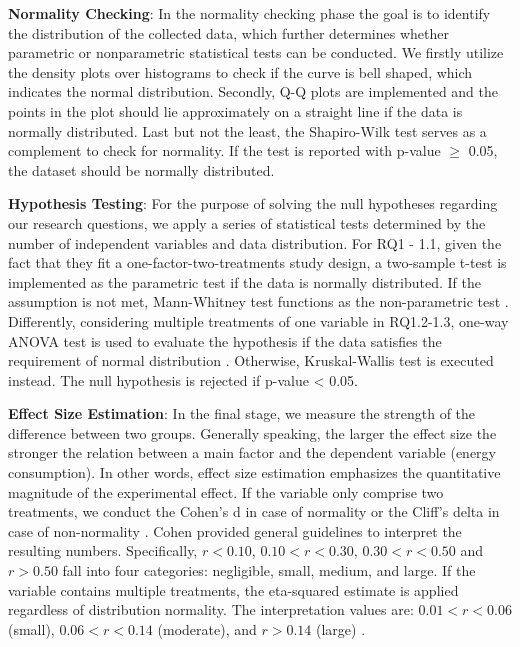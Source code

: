 	\textbf{Normality Checking}: In the normality checking phase the goal is to identify the distribution of the collected data, which further determines whether parametric or nonparametric statistical tests can be conducted. We firstly utilize the density plots over histograms to check if the curve is bell shaped, which indicates the normal distribution. Secondly, Q-Q plots are implemented and the points in the plot should lie approximately on a straight line if the data is normally distributed. Last but not the least, the Shapiro-Wilk test serves as a complement to check for normality. If the test is reported with p-value $\ge$ 0.05, the dataset should be normally distributed. 
	
	\textbf{Hypothesis Testing}: For the purpose of solving the null hypotheses regarding our research questions, we apply a series of statistical tests determined by the number of independent variables and data distribution. For RQ1 - 1.1, given the fact that they fit a one-factor-two-treatments study design, a two-sample t-test is implemented as the parametric test if the data is normally distributed. If the assumption is not met, Mann-Whitney test functions as the non-parametric test \cite{Fay2010Wilcoxon}.
	Differently, considering multiple treatments of one variable in RQ1.2-1.3, one-way ANOVA test is used to evaluate the hypothesis if the data satisfies the requirement of normal distribution \cite{Hecke2012Power}. Otherwise, Kruskal-Wallis test is executed instead. The null hypothesis is rejected if p-value < 0.05. 
	
	\textbf{Effect Size Estimation}: In the final stage, we measure the strength of the difference between two groups. Generally speaking, the larger the effect size the stronger the relation between a main factor and the dependent variable (\ie  energy consumption). In other words, effect size estimation emphasizes the quantitative magnitude of the experimental effect. If the variable only comprise two treatments, we conduct the Cohen’s d in case of normality or the Cliff’s delta in case of non-normality \cite{macbeth2011cliff}. Cohen \cite{cohen2013statistical} provided general guidelines to interpret the resulting numbers. Specifically, $r<0.10$, $0.10<r<0.30$, $0.30<r<0.50$ and $r>0.50$ fall into four categories: negligible, small, medium, and large. If the variable contains multiple treatments, the eta-squared estimate is applied regardless of distribution normality. The interpretation values are: $0.01< r<0.06$ (small), $0.06< r<0.14$ (moderate), and $r>0.14$ (large) \cite{tomczak2014need}. 



